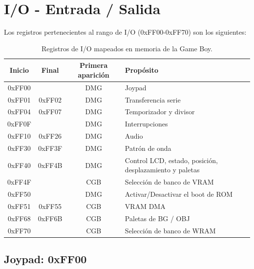 \section{I/O - Entrada / Salida}
Los registros pertenecientes al rango de I/O (0xFF00-0xFF70) son los siguientes:
\begin{table}[H]
    \centering
    \begin{tabular}{|c|c|c|p{5cm}|}
    \hline
    \textbf{Inicio} & \textbf{Final}   & \textbf{Primera aparición} & \textbf{Propósito} \\ \hline
    0xFF00         &                & DMG                     & Joypad \\ \hline
    0xFF01         & 0xFF02         & DMG                     & Transferencia serie \\ \hline
    0xFF04         & 0xFF07         & DMG                     & Temporizador y divisor \\ \hline
    0xFF0F         &                & DMG                     & Interrupciones \\ \hline
    0xFF10         & 0xFF26         & DMG                     & Audio \\ \hline
    0xFF30         & 0xFF3F         & DMG                     & Patrón de onda \\ \hline
    0xFF40         & 0xFF4B         & DMG                     & Control LCD, estado, posición, desplazamiento y paletas \\ \hline
    0xFF4F         &                & CGB                     & Selección de banco de VRAM \\ \hline
    0xFF50         &                & DMG                     & Activar/Desactivar el boot de ROM \\ \hline
    0xFF51         & 0xFF55         & CGB                     & VRAM DMA \\ \hline
    0xFF68         & 0xFF6B         & CGB                     & Paletas de BG / OBJ \\ \hline
    0xFF70         &                & CGB                     & Selección de banco de WRAM \\ \hline
    \end{tabular}
    \caption{Registros de I/O mapeados en memoria de la Game Boy.}
    \label{tab:memory_io_registers}
\end{table}

\subsection{Joypad: 0xFF00}

